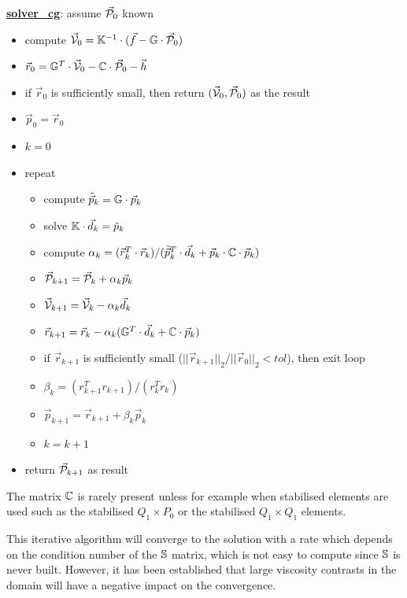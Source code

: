 \begin{mdframed}[backgroundcolor=blue!5]
\underline{\bf solver\_cg}: assume $\vec{\cal P}_0$ known
\begin{itemize}
\item compute $\vec{\cal V}_0={\mathbb{K}}^{-1}\cdot (\vec{f}-{\mathbb{G}} \cdot \vec{\cal P}_0)$
\item $\vec{r}_0 = {\mathbb{G}}^T\cdot \vec{\cal V}_0 -{\mathbb{C}} \cdot \vec{\cal P}_0 - \vec{h}$ 
\item if $\vec{r}_0$ is sufficiently small, then return $(\vec{\cal V}_0,\vec{\cal P}_0)$ as the result
\item $\vec{p}_0=\vec{r}_0$
\item $k=0$
\item repeat
\begin{itemize}
\item compute $\tilde{\vec{p}}_k = {\mathbb{G}} \cdot \vec{p}_k$
\item solve ${\mathbb{K}}\cdot \vec{d}_k = \tilde{p}_k$
\item compute $\alpha_k=(\vec{r}_k^T \cdot  \vec{r}_k)/(\tilde{\vec{p}}_k^T \cdot \vec{d}_k 
      + \vec{p}_k\cdot {\mathbb{C}}\cdot \vec{p}_k)$
\item $\vec{\cal P}_{k+1} = \vec{\cal P}_k+\alpha_k \vec{p}_k$
\item $ \vec{\cal V}_{k+1} = \vec{\cal V}_k - \alpha_k \vec{d}_k$
\item $\vec{r}_{k+1} = \vec{r}_k - \alpha_k ({\mathbb{G}}^T \cdot \vec{d}_k + {\mathbb{C}} \cdot \vec{p}_k) $
\item if $\vec{r}_{k+1}$ is sufficiently small ($||\vec{r}_{k+1}||_2/||\vec{r}_0||_2 <tol$), then exit loop
\item $\beta_k=(r_{k+1}^T r_{k+1})/(r_k^T r_k)$
\item $\vec{p}_{k+1} =\vec{r}_{k+1}+ \beta_k \vec{p}_k$
\item $k=k+1$
\end{itemize}
\item return $\vec{\cal P}_{k+1}$ as result
\end{itemize}
\end{mdframed}

\begin{remark}
The matrix ${\mathbb{C}}$ is rarely present unless for example when stabilised elements are used 
such as the stabilised $Q_1\times P_0$ or the stabilised $Q_1\times Q_1$ elements.
\end{remark}

This iterative algorithm will converge to the solution with a rate which depends on 
the condition number of the ${\mathbb{S}}$ matrix, which is not easy to compute since 
${\mathbb{S}}$ is never built. However, it has been established that large viscosity contrasts in the domain 
will have a negative impact on the convergence. 

